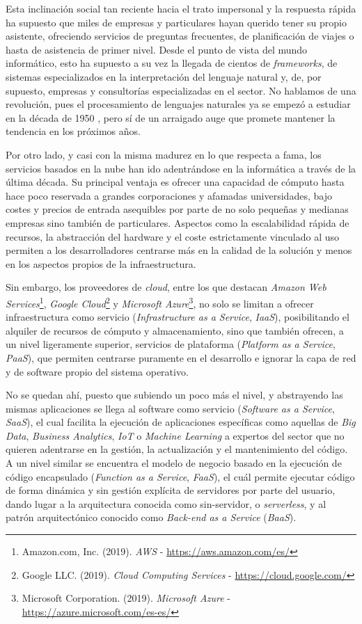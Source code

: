 \documentclass[11pt,spanish,listoffigures]{tfgetsinf}
\begin{document}
Esta inclinación social tan reciente hacia el trato impersonal y la respuesta rápida ha supuesto que miles de empresas y particulares hayan querido tener su propio asistente, ofreciendo servicios de preguntas frecuentes, de planificación de viajes o hasta de asistencia de primer nivel. Desde el punto de vista del mundo informático, esto ha supuesto a su vez la llegada de cientos de \textit{\gls{framework}s}, de sistemas especializados en la interpretación del lenguaje natural y, de, por supuesto, empresas y consultorías especializadas en el sector. No hablamos de una revolución, pues el procesamiento de lenguajes naturales ya se empezó a estudiar en la década de 1950 \cite{turing}, pero sí de un arraigado auge que promete mantener la tendencia en los próximos años.

Por otro lado, y casi con la misma madurez en lo que respecta a fama, los servicios basados en la nube han ido adentrándose en la informática a través de la última década. Su principal ventaja es ofrecer una capacidad de cómputo hasta hace poco reservada a grandes corporaciones y afamadas universidades, bajo costes y precios de entrada asequibles por parte de no solo pequeñas y medianas empresas sino también de particulares. Aspectos como la escalabilidad rápida de recursos, la abstracción del hardware y el coste estrictamente vinculado al uso permiten a los desarrolladores centrarse más en la calidad de la solución y menos en los aspectos propios de la infraestructura. 

Sin embargo, los proveedores de \textit{cloud}, entre los que destacan \textit{Amazon Web Services}\footnote{Amazon.com, Inc. (2019). \textit{AWS} - \url{https://aws.amazon.com/es/}}, \textit{Google Cloud}\footnote{Google LLC. (2019). \textit{Cloud Computing Services} - \url{https://cloud.google.com/}} y \textit{Microsoft Azure}\footnote{Microsoft Corporation. (2019). \textit{Microsoft Azure} - \url{https://azure.microsoft.com/es-es/}}, no solo se limitan a ofrecer infraestructura como servicio (\textit{Infrastructure as a Service}, \textit{IaaS}), posibilitando el alquiler de recursos de cómputo y almacenamiento, sino que también ofrecen, a un nivel ligeramente superior, servicios de plataforma (\textit{Platform as a Service}, \textit{PaaS}), que permiten centrarse puramente en el desarrollo e ignorar la capa de red y de software propio del sistema operativo. 

No se quedan ahí, puesto que subiendo un poco más el nivel, y abstrayendo las mismas aplicaciones se llega al software como servicio (\textit{Software as a Service}, \textit{SaaS}), el cual facilita la ejecución de aplicaciones específicas como aquellas de \textit{Big Data}, \textit{Business Analytics}, \textit{IoT} o \textit{Machine Learning} a expertos del sector que no quieren adentrarse en la gestión, la actualización y el mantenimiento del código. A un nivel similar se encuentra el modelo de negocio basado en la ejecución de código encapsulado (\textit{Function as a Service}, \textit{FaaS}), el cuál permite ejecutar código de forma dinámica y sin gestión explícita de servidores por parte del usuario, dando lugar a la arquitectura conocida como sin-servidor, o \textit{\gls{serverless}}, y al patrón arquitectónico conocido como \textit{Back-end as a Service} (\textit{BaaS}).
\end{document}
